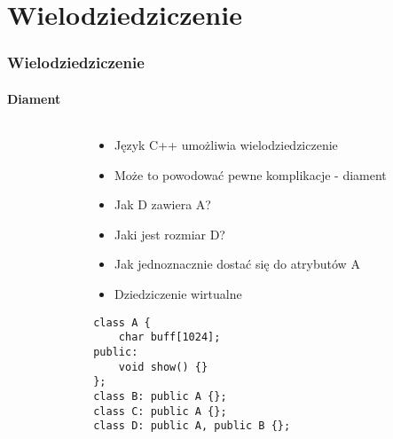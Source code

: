 \documentclass[10pt]{beamer}
\begin{document}
\section{Wielodziedziczenie}
\begin{frame}[fragile]
  \frametitle{Wielodziedziczenie}
  \framesubtitle{Diament}
  \begin{columns}
    \begin{column}{0.49\textwidth}
    \end{column}
    \begin{column}{0.49\textwidth}
    \begin{itemize}
      \item Język C++ umożliwia wielodziedziczenie
      \item Może to powodować pewne komplikacje - diament
      \item Jak D zawiera A?
      \item Jaki jest rozmiar D?
      \item Jak jednoznacznie dostać się do atrybutów A
      \item Dziedziczenie wirtualne
    \end{itemize}
\begin{lstlisting}
class A {
    char buff[1024];
public:
    void show() {}
};
class B: public A {};
class C: public A {};
class D: public A, public B {};
\end{lstlisting}
    \end{column}
  \end{columns}

\end{frame}
\end{document}
